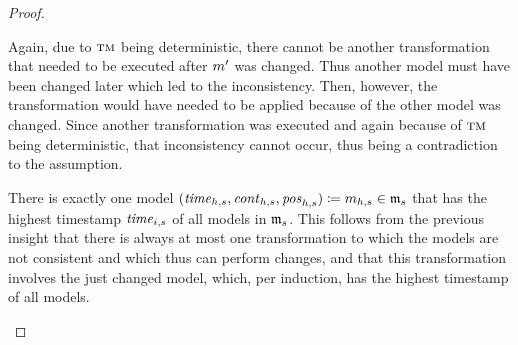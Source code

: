 \begin{proof}
\begin{longenumerate}
            Again, due to $\textsc{tm}$ being deterministic, there cannot be another transformation that needed to be executed after $\model{m}{}'$ was changed. Thus another model must have been changed later which led to the inconsistency. Then, however, the transformation would have needed to be applied because of the other model was changed.
            Since another transformation was executed and again because of $\textsc{tm}$ being deterministic, that inconsistency cannot occur, thus being a contradiction to the assumption.
        \item 
            There is exactly one model $(\mathvariable{time}_{h,s},\mathvariable{cont}_{h,s},\mathvariable{pos}_{h,s}) \equalsperdefinition \model{m}{h,s} \in \modeltuple{m}_{s}$ that has the highest timestamp $\mathit{time}_{i,s}$ of all models in $\modeltuple{m}_{s}$.
            This follows from the previous insight that there is always at most one transformation to which the models are not consistent and which thus can perform changes, and that this transformation involves the just changed model, which, per induction, has the highest timestamp of all models.

\end{longenumerate}
\end{proof}
